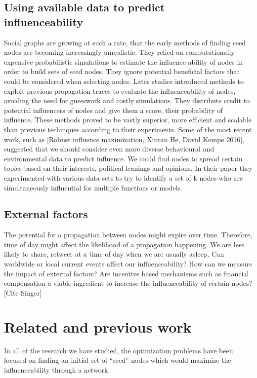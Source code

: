 \documentclass{acm_proc_article-sp}
\begin{document}
\subsection{Using available data to predict\\ influenceability}
Social graphs are growing at such a rate, that the early methods of finding seed nodes are becoming increasingly unrealistic. They relied on computationally expensive probabilistic simulations to estimate the influence-ability of nodes in order to build sets of seed nodes. They ignore potential beneficial factors that could be considered when selecting nodes. Later studies introduced methods to exploit previous propagation traces to evaluate the influenceability of nodes, avoiding the need for guesswork and costly simulations.\cite{goyal:datainfluence} They distribute credit to potential influencers of nodes and give them a score, their probability of influence. These methods proved to be vastly superior, more efficient and scalable than previous techniques according to their experiments. Some of the most recent work, such as [Robust influence maximization, Xinran He, David Kempe 2016], suggested that we should consider even more diverse behavioural and environmental data to predict influence. We could find nodes to spread certain topics based on their interests, political leanings and opinions. In their paper they experimented with various data sets to try to identify a set of k nodes who are simultaneously influential for multiple functions or models.

\subsection{External factors}
The potential for a propagation between nodes might expire over time. Therefore, time of day might affect the likelihood of a propagation happening. We are less likely to share, retweet at a time of day when we are usually asleep. Can worldwide or local current events affect our influenceability? How can we measure the impact of external factors? Are incentive based mechanisms such as financial compensation a viable ingredient to increase the influenceability of certain nodes? [Cite Singer]

\section{Related and previous work}

In all of the research we have studied, the optimization problems have been focused on finding an initial set of “seed” nodes which would maximize the influenceability through a network. \\
\end{document}
